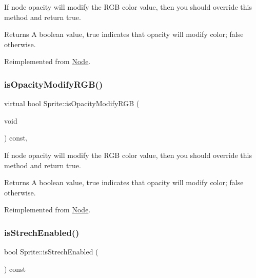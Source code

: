 If node opacity will modify the R\+GB color value, then you should override this method and return true. \begin{DoxyReturn}{Returns}
A boolean value, true indicates that opacity will modify color; false otherwise. 
\end{DoxyReturn}


Reimplemented from \hyperlink{classNode_ae6ce32d2088e2bb3426608334f1091c5}{Node}.

\mbox{\label{classSprite_af25cfe5f1f6178f5a13db86a258848d0}} 
\subsubsection{\texorpdfstring{is\+Opacity\+Modify\+R\+G\+B()}{isOpacityModifyRGB()}\hspace{0.1cm}{\footnotesize\ttfamily [2/2]}}
{\footnotesize\ttfamily virtual bool Sprite\+::is\+Opacity\+Modify\+R\+GB (\begin{DoxyParamCaption}\item[{void}]{ }\end{DoxyParamCaption}) const\hspace{0.3cm}{\ttfamily [override]}, {\ttfamily [virtual]}}

If node opacity will modify the R\+GB color value, then you should override this method and return true. \begin{DoxyReturn}{Returns}
A boolean value, true indicates that opacity will modify color; false otherwise. 
\end{DoxyReturn}


Reimplemented from \hyperlink{classNode_ae6ce32d2088e2bb3426608334f1091c5}{Node}.

\mbox{\label{classSprite_ab7af90fb9be0abea89d551213a789ad4}} 
\subsubsection{\texorpdfstring{is\+Strech\+Enabled()}{isStrechEnabled()}}
{\footnotesize\ttfamily bool Sprite\+::is\+Strech\+Enabled (\begin{DoxyParamCaption}{ }\end{DoxyParamCaption}) const}

